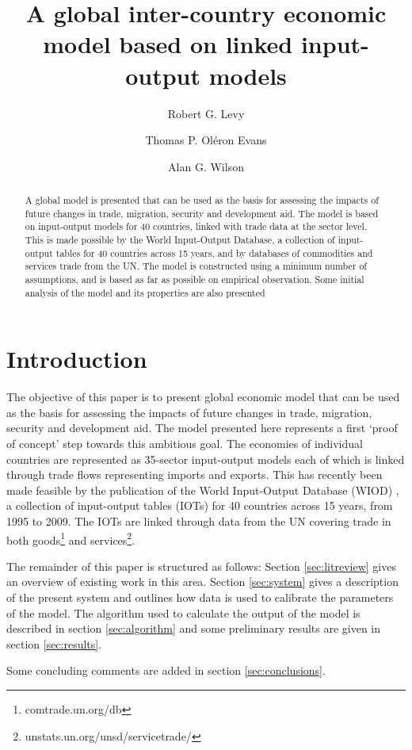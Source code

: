 \documentclass[a4paper]{article}
\title{A global inter-country economic model based on linked input-output models}
\author[*]{Robert G. Levy}
\author[**]{Thomas P. Ol\'{e}ron Evans}
\author[*]{Alan G. Wilson}
\affil[*]{Centre for Advanced Spatial Analysis, UCL Bartlett Faculty of the Built Environment,
90 Tottenham Court Road, London W1T 4TJ, UK}
\affil[**]{Department of Mathematics, University College London, Gower Street, London WC1E 6BT, UK}
\begin{document}
\maketitle

\begin{abstract}
A global model is presented that can be used as the basis for assessing the impacts of future changes in trade, migration, security and development aid.
The model is based on input-output models for 40 countries, linked with trade data at the sector level.
This is made possible by the World Input-Output Database, a collection of input-output tables for 40 countries across 15 years, and by databases of commodities and services trade from the UN.
The model is constructed using a minimum number of assumptions, and is based as far as possible on empirical observation.
Some initial analysis of the model and its properties are also presented
\end{abstract}

\section{Introduction}
The objective of this paper is to present global economic model that can be used as the basis for assessing the impacts of future changes in trade, migration, security and development aid.
The model presented here represents a first `proof of concept' step towards this ambitious goal.
The economies of individual countries are represented as 35-sector input-output models each of which is linked through trade flows representing imports and exports.
This has recently been made feasible by the publication of the World Input-Output Database (WIOD) \parencite{Timmer2012}, a collection of input-output tables (IOTs) for 40 countries across 15 years, from 1995 to 2009.
The IOTs are linked through data from the UN covering trade in both goods\footnote{comtrade.un.org/db} and services\footnote{unstats.un.org/unsd/servicetrade/}.

The remainder of this paper is structured as follows: 
Section \ref{sec:litreview} gives an overview of existing work in this area.
Section \ref{sec:system} gives a description of the present system and outlines how data is used to calibrate the parameters of the model.
The algorithm used to calculate the output of the model is described in section \ref{sec:algorithm} and some preliminary results are given in section \ref{sec:results}.

Some concluding comments are added in section \ref{sec:conclusions}.
\end{document}
